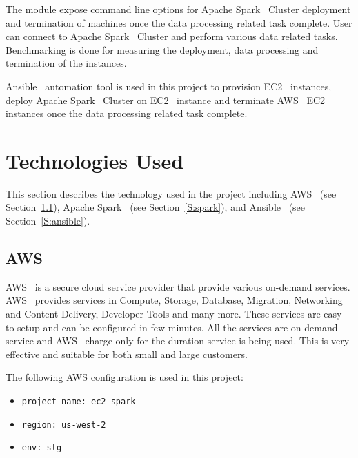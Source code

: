 The module expose command line options for Apache
Spark~\cite{hid-sp18-511-www-spark} Cluster deployment and termination
of machines once the data processing related task complete. User can
connect to Apache Spark~\cite{hid-sp18-511-www-spark} Cluster and
perform various data related tasks. Benchmarking is done for measuring
the deployment, data processing and termination of the instances.

Ansible~\cite{hid-sp18-511-www-ansible} automation tool is used in
this project to provision EC2~\cite{hid-sp18-511-www-ec2} instances,
deploy Apache Spark~\cite{hid-sp18-511-www-spark} Cluster on
EC2~\cite{hid-sp18-511-www-ec2} instance and terminate
AWS~\cite{hid-sp18-511-www-aws} EC2~\cite{hid-sp18-511-www-ec2}
instances once the data processing related task complete.

\section{Technologies Used}

This section describes the technology used in the project including
AWS~\cite{hid-sp18-511-www-aws} (see Section~\ref{S:aws}), Apache
Spark~\cite{hid-sp18-511-www-spark} (see Section~\ref{S:spark}), and
Ansible~\cite{hid-sp18-511-www-ansible} (see Section~\ref{S:ansible}).

\subsection{AWS}\label{S:aws}

AWS~\cite{hid-sp18-511-www-aws} is a secure cloud service provider
that provide various on-demand services.
AWS~\cite{hid-sp18-511-www-aws} provides services in Compute, Storage,
Database, Migration, Networking and Content Delivery, Developer Tools
and many more. These services are easy to setup and can be configured
in few minutes. All the services are on demand service and
AWS~\cite{hid-sp18-511-www-aws} charge only for the duration service
is being used. This is very effective and suitable for both small and
large customers.

The following AWS configuration is used in this project:

\begin{itemize}
	\item \verb|project_name: ec2_spark|
	\item \verb|region: us-west-2|
	\item \verb|env: stg|
\end{itemize}



